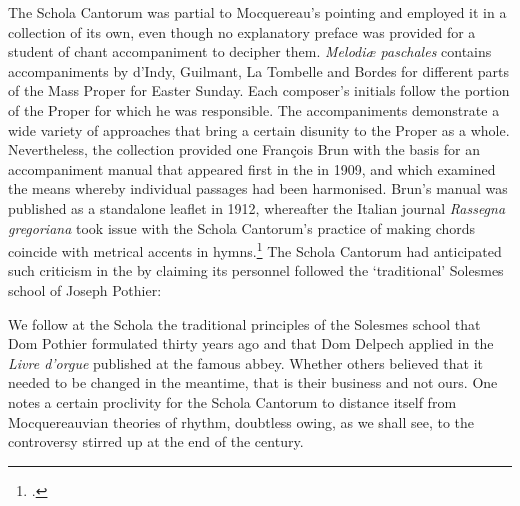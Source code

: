 %
The Schola Cantorum was partial to Mocquereau's pointing and employed it in a collection of its own, even though no explanatory preface was provided for a student of chant accompaniment to decipher them.
\emph{Melodiæ paschales} contains accompaniments by d'Indy, Guilmant, La Tombelle and Bordes for different parts of the Mass Proper for Easter Sunday.
Each composer's initials follow the portion of the Proper for which he was responsible.
The accompaniments demonstrate a wide variety of approaches that bring a certain disunity to the Proper as a whole.
Nevertheless, the collection provided one François Brun with the basis for an accompaniment manual that appeared first in the \tsg{} in 1909, and which examined the means whereby individual passages had been harmonised.
Brun's manual was published as a standalone leaflet in 1912, whereafter the Italian journal \emph{Rassegna gregoriana} took issue with the Schola Cantorum's practice of making chords coincide with metrical accents in hymns.\footcite[p.21 \S{}1 n.~2 and \emph{passim}]{BrunTraiteaccompagnementchant1912}
The Schola Cantorum had anticipated such criticism in the \tsg{} by claiming its personnel followed the `traditional' Solesmes school of Joseph Pothier:
\noclub[2]

  {\cite[92]{Reponsespolemiquesgregoriennes1910}}
{We follow at the Schola the traditional principles of the Solesmes school that Dom Pothier formulated thirty years ago and that Dom Delpech applied in the \emph{Livre d'orgue} published at the famous abbey. Whether others believed that it needed to be changed in the meantime, that is their business and not ours.}
\noindent
One notes a certain proclivity for the Schola Cantorum to distance itself from \mbox{Mocquereauvian} theories of rhythm, doubtless owing, as we shall see, to the controversy stirred up at the end of the century.

